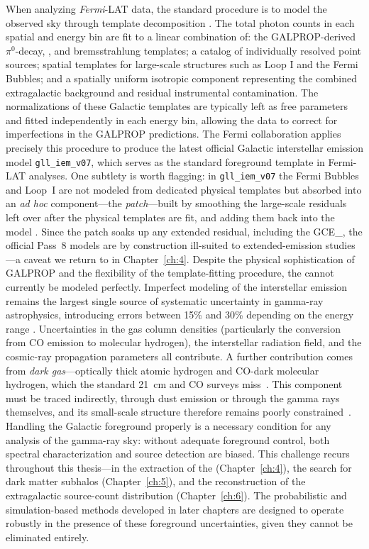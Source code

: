 When analyzing \textit{Fermi}-LAT data, the standard procedure is to model the observed sky through template decomposition \cite{Fermi-LAT:2014ryh}.
The total photon counts in each spatial and energy bin are fit to a linear combination of: the GALPROP-derived $\pi^0$-decay, \ICS, and bremsstrahlung templates; a catalog of individually resolved point sources; spatial templates for large-scale structures such as Loop I and the Fermi Bubbles; and a spatially uniform isotropic component representing the combined extragalactic background and residual instrumental contamination.
The normalizations of these Galactic templates are typically left as free parameters and fitted independently in each energy bin, allowing the data to correct for imperfections in the GALPROP predictions.
The Fermi collaboration applies precisely this procedure to produce the latest official Galactic interstellar emission model \texttt{gll\_iem\_v07}, which serves as the standard foreground template in Fermi-LAT analyses.
One subtlety is worth flagging: in \texttt{gll\_iem\_v07} the Fermi Bubbles and Loop~I are not modeled from dedicated physical templates but absorbed into an \emph{ad hoc} component---the \emph{patch}---built by smoothing the large-scale residuals left over after the physical templates are fit, and adding them back into the model \cite{Fermi-LAT:2019yla,Fermi-LAT:2022byn}.
Since the patch soaks up any extended residual, including the \gls{GCE_}, the official Pass~8 models are by construction ill-suited to extended-emission studies---a caveat we return to in Chapter~\ref{ch:4}.
Despite the physical sophistication of GALPROP and the flexibility of the template-fitting procedure, the \GDE cannot currently be modeled perfectly.
Imperfect modeling of the interstellar emission remains the largest single source of systematic uncertainty in gamma-ray astrophysics, introducing errors between 15\% and 30\% depending on the energy range \cite{Fermi-LAT:2014ryh,DGRB-review}.
Uncertainties in the gas column densities (particularly the conversion from CO emission to molecular hydrogen), the interstellar radiation field, and the cosmic-ray propagation parameters all contribute.
A further contribution comes from \emph{dark gas}---optically thick atomic hydrogen and CO-dark molecular hydrogen, which the standard 21~cm and CO surveys miss~\cite{Grenier:2005kbp}.
This component must be traced indirectly, through dust emission or through the gamma rays themselves, and its small-scale structure therefore remains poorly constrained~\cite{Fermi-LAT:2016zaq}.
Handling the Galactic foreground properly is a necessary condition for any analysis of the gamma-ray sky: without adequate foreground control, both spectral characterization and source detection are biased.
This challenge recurs throughout this thesis---in the extraction of the \GCE (Chapter~\ref{ch:4}), the search for dark matter subhalos (Chapter~\ref{ch:5}), and the reconstruction of the extragalactic source-count distribution (Chapter~\ref{ch:6}).
The probabilistic and simulation-based methods developed in later chapters are designed to operate robustly in the presence of these foreground uncertainties, given they cannot be eliminated entirely.
